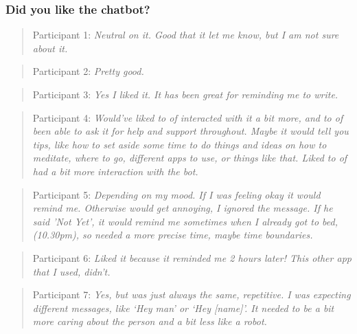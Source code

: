 \subsubsection*{Did you like the chatbot?}
\begin{quote}
Participant 1: \textit{Neutral on it. Good that it let me know, but I am not sure about it.}
\end{quote}
\begin{quote}
Participant 2: \textit{Pretty good.}
\end{quote}
\begin{quote}
Participant 3: \textit{Yes I liked it. It has been great for reminding me to write.}
\end{quote}
\begin{quote}
Participant 4: \textit{Would've liked to of interacted with it a bit more, and to of been able to ask it for help and support throughout. Maybe it would tell you tips, like how to set aside some time to do things and ideas on how to meditate, where to go, different apps to use, or things like that. Liked to of had a bit more interaction with the bot.}
\end{quote}
\begin{quote}
Participant 5: \textit{Depending on my mood. If I was feeling okay it would remind me. Otherwise would get annoying, I ignored the message. If he said 'Not Yet', it would remind me sometimes when I already got to bed, (10.30pm), so needed a more precise time, maybe time boundaries.}
\end{quote}
\begin{quote}
Participant 6: \textit{Liked it because it reminded me 2 hours later! This other app that I used, didn't.}
\end{quote}
\begin{quote}
Participant 7: \textit{Yes, but was just always the same, repetitive. I was expecting different messages, like `Hey man' or `Hey [name]'. It needed to be a bit more caring about the person and a bit less like a robot.}
\end{quote}

